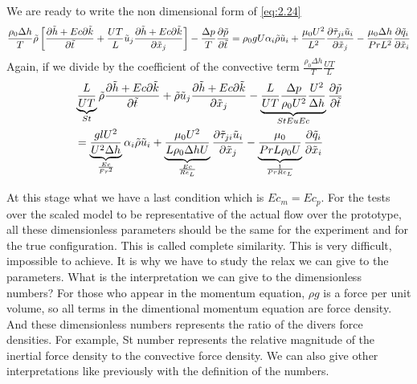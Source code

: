 		We are ready to write the non dimensional form of \eqref{eq:2.24}
		\begin{equation}
			\frac{\rho _0 \Delta h}{T} \tilde{\rho} \left[\frac{\partial \tilde{h}+ Ec \partial \tilde{k}}{\partial \tilde{t}} + \frac{UT}{L} \tilde{u}_j \frac{\partial \tilde{h} + Ec \partial \tilde{k}}{\partial \tilde{x}_j} \right] - \frac{\Delta p}{T} \frac{\partial \tilde{p}}{\partial \tilde{t}} = \rho _0 g U \alpha _i \tilde{\rho} \tilde{u}_i + \frac{\mu _0 U^2}{L^2} \frac{\partial \tilde{\tau} _{ji} \tilde{u}_i}{\partial \tilde{x}_j} - \frac{\mu _0 \Delta h}{Pr L^2} \frac{\partial \tilde{q}_i}{\partial \tilde{x}_i}
 		\end{equation}
 		Again, if we divide by the coefficient of the convective term $\frac{\rho _0 \Delta h}{T}\frac{UT}{L}$
 		\begin{equation}
 		\begin{aligned}
 			&\underbrace{\frac{L}{UT}}_{St} \tilde{\rho} \frac{\partial \tilde{h}+ Ec \partial \tilde{k}}{\partial \tilde{t}} + \tilde{\rho} \tilde{u}_j \frac{\partial \tilde{h} + Ec \partial \tilde{k}}{\partial \tilde{x}_j} - \underbrace{\frac{L}{UT}\frac{\Delta p}{\rho _0 U^2}\frac{U^2}{\Delta h}}_{StEuEc} \frac{\partial \tilde{p}}{\partial \tilde{t}} \\
 			&= \underbrace{\frac{glU^2}{U^2\Delta h}}_{\frac{Ec}{Fr^2}} \alpha _i \tilde{\rho} \tilde{u}_i + \underbrace{\frac{\mu _0 U^2}{L\rho _0 \Delta h U}}_{\frac{Ec}{Re_L} }\frac{\partial \tilde{\tau} _{ji} \tilde{u}_i}{\partial \tilde{x}_j} - \underbrace{\frac{\mu _0 }{Pr L \rho _0 U}}_{\frac{1}{Pr Re_L}} \frac{\partial \tilde{q}_i}{\partial \tilde{x}_i}
 		\end{aligned}
 		\end{equation}
 		\begin{center}
 		\end{center}
 		
 		At this stage what we have a last condition which is $Ec_m = Ec_p$. For the tests over the scaled model to be representative of the actual flow over the prototype, all these dimensionless parameters should be the same for the experiment and for the true configuration. This is called complete similarity. This is very difficult, impossible to achieve. It is why we have to study the relax we can give to the parameters. What is the interpretation we can give to the dimensionless numbers? For those who appear in the momentum equation, $\rho g$ is a force per unit volume, so all terms in the dimentional momentum equation are force density. And these dimensionless numbers represents the ratio of the divers force densities. For example, St number represents the relative magnitude of the inertial force density to the convective force density. We can also give other interpretations like previously with the definition of the numbers. 
 		
